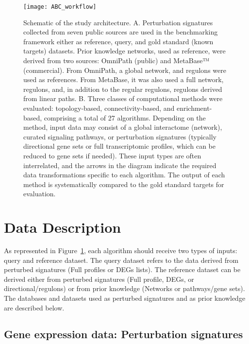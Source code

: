 \begin{figure}[htbp]
    \centering
    \texttt{[image: ABC\_workflow]}
    \caption{Schematic of the study architecture. A. Perturbation signatures collected from seven public sources are used in the benchmarking framework either as reference, query, and gold standard (known targets) datasets. Prior knowledge networks, used as reference, were derived from two sources: OmniPath (public) and MetaBase™ (commercial). From OmniPath, a global network, and regulons were used as references. From MetaBase, it was also used a full network, regulons, and, in addition to the regular regulons, regulons derived from linear paths. B. Three classes of computational methods were evaluated: topology-based, connectivity-based, and enrichment-based, comprising a total of 27 algorithms. Depending on the method, input data may consist of a global interactome (network), curated signaling pathways, or perturbation signatures (typically directional gene sets or full transcriptomic profiles, which can be reduced to gene sets if needed). These input types are often interrelated, and the arrows in the diagram indicate the required data transformations specific to each algorithm. The output of each method is systematically compared to the gold standard targets for evaluation.}
    \label{fig:fig4}
\end{figure}


\section{Data Description} %
\label{sec:data_description}

As represented in Figure~\ref{fig:fig4}, each algorithm should receive two types of inputs: query and reference dataset. The query dataset refers to the data derived from perturbed signatures (Full profiles or DEGs lists). The reference dataset can be derived either from perturbed signatures (Full profile, DEGs, or directional/regulons) or from prior knowledge (Networks or pathways/gene sets). The databases and datasets used as perturbed signatures and as prior knowledge are described below.

\subsection{Gene expression data: Perturbation signatures}
\label{sub:gene_expression_data_perturbation_signatures}

